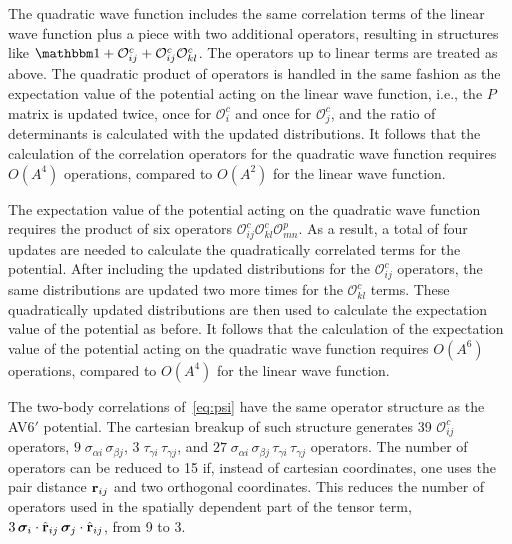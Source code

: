 \documentclass[aps,prc,twocolumn,superscriptaddress,floatfix]{revtex4-1}
\begin{document}
The quadratic wave function includes the same correlation terms 
of the linear wave function plus a piece with two additional operators,
resulting in structures like $\mathbbm1+\mathcal{O}^c_{ij}+\mathcal{O}^c_{ij}\mathcal{O}^c_{kl}$. 
The operators up to linear terms are treated as above. 
The quadratic product of operators is handled in the same fashion 
as the expectation value of the potential acting on the linear wave function, i.e., 
the $P$ matrix is updated twice, once for $\mathcal{O}^c_i$ and once 
for $\mathcal{O}^c_j$, and the ratio of determinants is calculated with 
the updated distributions. It follows that the calculation of the correlation 
operators for the quadratic wave function requires $O(A^4)$ operations, compared
to $O(A^2)$ for the linear wave function.

The expectation value of the potential acting on the quadratic wave function 
requires the product of six operators $\mathcal{O}^c_{ij}\mathcal{O}^c_{kl}\mathcal{O}^p_{mn}$. 
As a result, a total of four updates are needed to calculate the quadratically correlated 
terms for the potential. After including the updated 
distributions for the $\mathcal{O}^c_{ij}$ operators, the same distributions are updated 
two more times for the $\mathcal{O}^c_{kl}$ terms. These quadratically updated distributions 
are then used to calculate the expectation value of the potential as before. 
It follows that the calculation of the expectation value of the potential acting 
on the quadratic wave function requires $O(A^6)$ operations, compared
to $O(A^4)$ for the linear wave function.

The two-body correlations of~\cref{eq:psi} have the same operator structure as the 
AV6$'$ potential. The cartesian breakup of such structure generates 39 $\mathcal O^c_{ij}$ operators,  
$9\;\sigma_{\alpha i}\,\sigma_{\beta j}$, $3\;\tau_{\gamma i}\,\tau_{\gamma j}$,
and $27\;\sigma_{\alpha i}\,\sigma_{\beta j}\,\tau_{\gamma i}\,\tau_{\gamma j}$ operators. 
The number of operators can be reduced to 15 if, instead of cartesian coordinates, 
one uses the pair distance $\vb{r}_{ij}$ and two orthogonal coordinates. 
This reduces the number of operators used in the spatially dependent part of the tensor term, $3\,\bm\sigma_i\cdot\hat{\vb{r}}_{ij}\,\bm\sigma_j\cdot\hat{\vb{r}}_{ij}$, from 9 to 3.



\end{document}
